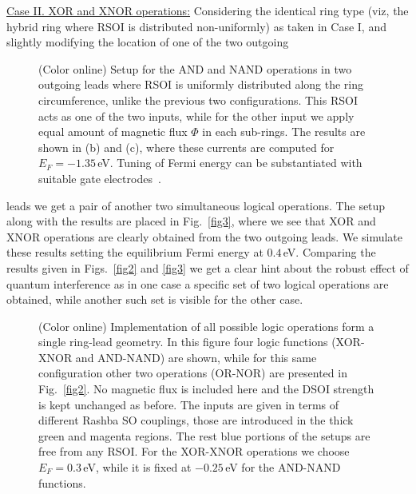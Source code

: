 \documentclass[doublecol]{epl2}
\begin{document}
\vskip 0.25cm
\noindent
{\underline{Case II. XOR and XNOR operations:}} Considering the identical
ring type (viz, the hybrid ring where RSOI is distributed non-uniformly) as 
taken in Case I, and slightly modifying the location of one of the two outgoing 
\begin{figure}[ht]
{\centering {}\par}
\caption{(Color online) Setup for the AND and NAND operations in two outgoing
leads where RSOI is uniformly distributed along the ring circumference, unlike
the previous two configurations. This RSOI acts as one of the two inputs, while
for the other input we apply equal amount of magnetic flux $\Phi$ in each
sub-rings. The results are shown in (b) and (c), where these currents are 
computed for $E_F=-1.35\,$eV. Tuning of Fermi energy can be substantiated 
with suitable gate electrodes~\cite{gate3,gate4}.}
\label{fig4}
\end{figure}
leads we get a pair of another two simultaneous logical operations. The setup 
along with the results are placed in Fig.~\ref{fig3}, where we see that XOR and 
XNOR operations are clearly obtained from the two outgoing leads. We simulate 
these results setting the equilibrium Fermi energy at $0.4\,$eV. Comparing the
results given in Figs.~\ref{fig2} and \ref{fig3} we get a clear hint about the
robust effect of quantum interference as in one case a specific set of two 
logical operations are obtained, while another such set is visible for the 
other case.
\begin{figure*}[ht]
{\centering
{}
\par}
\caption{(Color online) Implementation of all possible logic operations 
form a single ring-lead geometry. In this figure four logic functions 
(XOR-XNOR and AND-NAND) are shown, while for this same configuration 
other two operations (OR-NOR) are presented in Fig.~\ref{fig2}. No 
magnetic flux is included
here and the DSOI strength is kept unchanged as before. The inputs are given 
in terms of different Rashba SO couplings, those are introduced in the thick 
green and magenta regions. The rest blue portions of the setups are free 
from any RSOI. For the XOR-XNOR operations we choose $E_F=0.3\,$eV, while 
it is fixed at $-0.25\,$eV for the AND-NAND functions.}
\label{fig5}
\end{figure*}
\end{document}
